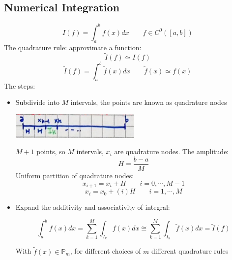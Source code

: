 \subsection{Numerical Integration}
$$
I(f)=\int_{a}^bf(x)dx\qquad
f\in C^0\left([a,b]\right)
$$
The quadrature rule: approximate a function:
$$
\tilde{I}(f)\simeq I(f)
$$
$$
\tilde{I}(f)=\int_{a}^b\tilde{f}(x)dx\qquad
\tilde{f}(x)\simeq f(x)
$$
The steps:
\begin{itemize}
    \item Subdivide into $M$ intervals, the points are known as quadrature nodes
    \begin{center}
        \includegraphics[width=0.5\textwidth]{images/quadrature_nodes.png}
    \end{center}
    $M+1$ points, so $M$ intervals, $x_i$ are quadrature nodes. The amplitude:
    $$
    H=\frac{b-a}{M}
    $$
    Uniform partition of quadrature nodes:
    $$
    x_{i+1}=x_i+H\qquad
    i=0,\cdots,M-1
    $$
    $$
    x_i=x_0+(i)H\qquad i=1,\cdots,M
    $$
    \item Expand the additivity and associativity of integral:
    \begin{LARGE}
        $$
        \int_{a}^bf(x)dx=\sum_{k=1}^M\int_{I_k}f(x)dx\cong
        \sum_{k=1}^M\int_{I_k}\tilde{f}(x)dx=\tilde{I}(f)
        $$
    \end{LARGE}
    With $\tilde{f}(x)\in\mathbb{P}_m$, for different choices of $m$ different quadrature rules
\end{itemize}

